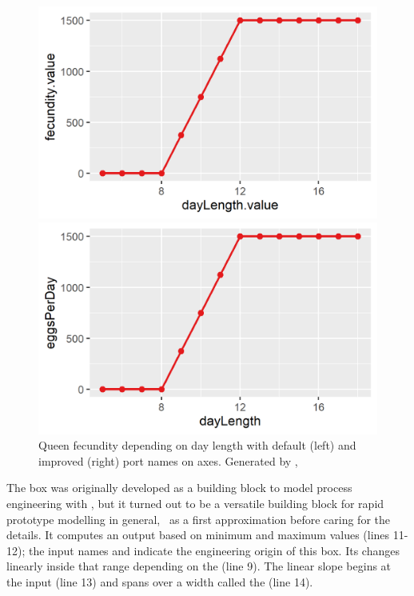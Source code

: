 \begin{figure} [b]
  \centering
  \begin{minipage}[b]{0.45\textwidth}
    \includegraphics[width=\textwidth]{graphics/honeybee1-1}
  \end{minipage}
  \begin{minipage}[b]{0.45\textwidth}
    \includegraphics[width=\textwidth]{graphics/honeybee1-2}
  \end{minipage}
  \caption{Queen fecundity depending on day length with default (left) and improved (right) port names on axes. Generated by ,}
  \label{fig:honeybee1}
\end{figure}

The  box was originally developed as a building block to model process engineering with \US, but it turned out to be a versatile building block for rapid prototype modelling in general, \ie\ as a first approximation before caring for the details. It computes an output  based on minimum and maximum values (lines 11-12); the input names  and  indicate  the engineering origin of this box. Its  changes linearly inside that range depending on the  (line 9). The linear slope begins at the input  (line 13) and spans over a width called the  (line 14).

